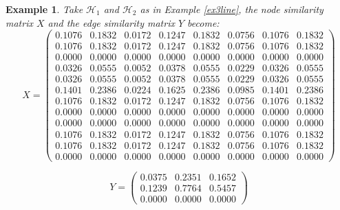 \documentclass[a4paper,11pt]{report}
\newtheorem{example}[theorem]{Example}
\newcommand{\hgrafeen}{\mathcal{H}}
\begin{document}
\begin{example}
  Take $\hgrafeen_1$ and $\hgrafeen_2$ as in Example \ref{ex3line}, the node 
  similarity matrix $X$ and the edge similarity matrix $Y$ become:
  $$X=\begin{pmatrix}
    0.1076&0.1832&0.0172&0.1247&0.1832&0.0756&0.1076&0.1832\\
0.1076&0.1832&0.0172&0.1247&0.1832&0.0756&0.1076&0.1832\\
0.0000&0.0000&0.0000&0.0000&0.0000&0.0000&0.0000&0.0000\\
0.0326&0.0555&0.0052&0.0378&0.0555&0.0229&0.0326&0.0555\\
0.0326&0.0555&0.0052&0.0378&0.0555&0.0229&0.0326&0.0555\\
0.1401&0.2386&0.0224&0.1625&0.2386&0.0985&0.1401&0.2386\\
0.1076&0.1832&0.0172&0.1247&0.1832&0.0756&0.1076&0.1832\\
0.0000&0.0000&0.0000&0.0000&0.0000&0.0000&0.0000&0.0000\\
0.0000&0.0000&0.0000&0.0000&0.0000&0.0000&0.0000&0.0000\\
0.1076&0.1832&0.0172&0.1247&0.1832&0.0756&0.1076&0.1832\\
0.1076&0.1832&0.0172&0.1247&0.1832&0.0756&0.1076&0.1832\\
0.0000&0.0000&0.0000&0.0000&0.0000&0.0000&0.0000&0.0000
  \end{pmatrix}$$
  
    $$Y=\begin{pmatrix}
    0.0375&0.2351&0.1652\\
0.1239&0.7764&0.5457\\
0.0000&0.0000&0.0000
  \end{pmatrix}$$
  

\end{example}
\end{document}
